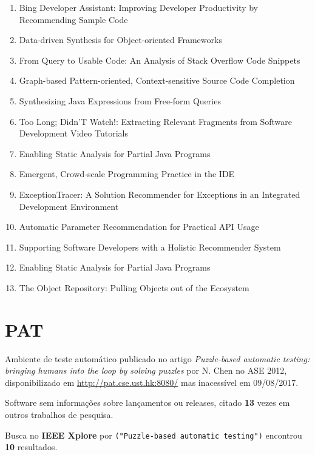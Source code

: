 \begin{enumerate}
\item Bing Developer Assistant: Improving Developer Productivity by Recommending Sample Code
\item Data-driven Synthesis for Object-oriented Frameworks
\item From Query to Usable Code: An Analysis of Stack Overflow Code Snippets
\item Graph-based Pattern-oriented, Context-sensitive Source Code Completion
\item Synthesizing Java Expressions from Free-form Queries
\item Too Long; Didn'T Watch!: Extracting Relevant Fragments from Software Development Video Tutorials
\item Enabling Static Analysis for Partial Java Programs
\item Emergent, Crowd-scale Programming Practice in the IDE
\item ExceptionTracer: A Solution Recommender for Exceptions in an Integrated Development Environment
\item Automatic Parameter Recommendation for Practical API Usage
\item Supporting Software Developers with a Holistic Recommender System
\item Enabling Static Analysis for Partial Java Programs
\item The Object Repository: Pulling Objects out of the Ecosystem
\end{enumerate}

\section{PAT}

Ambiente de teste automático
publicado no artigo {\it Puzzle-based automatic testing: bringing humans into the loop by solving puzzles}
por N. Chen
no ASE 2012,
disponibilizado em \url{http://pat.cse.ust.hk:8080/}
mas inacessível em 09/08/2017.

Software sem informações sobre lançamentos ou releases,
citado {\bf 13} vezes em outros trabalhos de pesquisa.

Busca no {\bf IEEE Xplore} por
\texttt{("Puzzle-based automatic testing")}
encontrou {\bf 10}
resultados.

